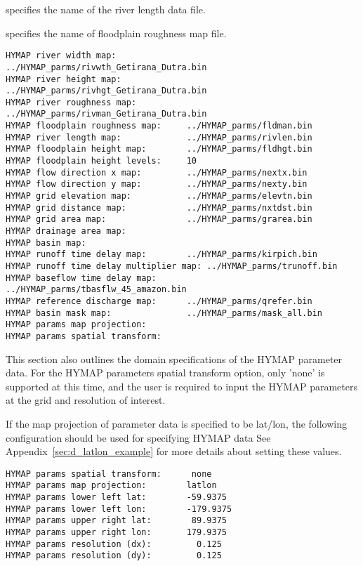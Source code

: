  specifies the name of the river length data file.

 specifies the name of floodplain roughness map file.

 

 \begin{Verbatim}[frame=single]
HYMAP river width map:              ../HYMAP_parms/rivwth_Getirana_Dutra.bin
HYMAP river height map:             ../HYMAP_parms/rivhgt_Getirana_Dutra.bin 
HYMAP river roughness map:          ../HYMAP_parms/rivman_Getirana_Dutra.bin 
HYMAP floodplain roughness map:     ../HYMAP_parms/fldman.bin
HYMAP river length map:             ../HYMAP_parms/rivlen.bin
HYMAP floodplain height map:        ../HYMAP_parms/fldhgt.bin
HYMAP floodplain height levels:     10
HYMAP flow direction x map:         ../HYMAP_parms/nextx.bin
HYMAP flow direction y map:         ../HYMAP_parms/nexty.bin
HYMAP grid elevation map:           ../HYMAP_parms/elevtn.bin
HYMAP grid distance map:            ../HYMAP_parms/nxtdst.bin
HYMAP grid area map:                ../HYMAP_parms/grarea.bin
HYMAP drainage area map:
HYMAP basin map:
HYMAP runoff time delay map:        ../HYMAP_parms/kirpich.bin
HYMAP runoff time delay multiplier map: ../HYMAP_parms/trunoff.bin
HYMAP baseflow time delay map:      ../HYMAP_parms/tbasflw_45_amazon.bin
HYMAP reference discharge map:      ../HYMAP_parms/qrefer.bin
HYMAP basin mask map:               ../HYMAP_parms/mask_all.bin 
HYMAP params map projection:
HYMAP params spatial transform:
 \end{Verbatim}

 
 This section also outlines the domain specifications of the
 HYMAP parameter data.
 For the HYMAP parameters spatial transform option, only 'none' is
 supported at this time, and the user is required to input the HYMAP
 parameters at the grid and resolution of interest.

 If the map projection of parameter data is specified to be lat/lon,
 the following configuration should be used for specifying HYMAP data
 See Appendix~\ref{sec:d_latlon_example} for more details about
 setting these values.
 

 \begin{Verbatim}[frame=single]
HYMAP params spatial transform:      none
HYMAP params map projection:        latlon
HYMAP params lower left lat:        -59.9375
HYMAP params lower left lon:        -179.9375
HYMAP params upper right lat:        89.9375
HYMAP params upper right lon:       179.9375
HYMAP params resolution (dx):         0.125
HYMAP params resolution (dy):         0.125
 \end{Verbatim}


